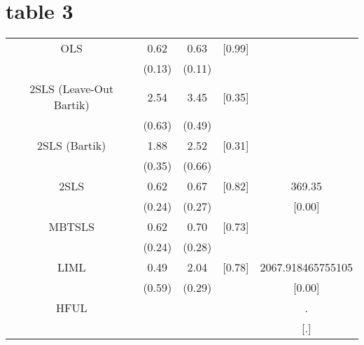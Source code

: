 \documentclass{article}
\begin{document}
\section{table 3}
\begin{tabular}{ccccc}
OLS & 0.62 & 0.63 & [0.99] & \\
    & (0.13)& (0.11)&         & \\
2SLS (Leave-Out Bartik) & 2.54 & 3.45 & [0.35] & \\
    & (0.63) & (0.49) &         & \\
2SLS (Bartik) & 1.88 & 2.52 & [0.31] & \\
    & (0.35) & (0.66) &         & \\
2SLS & 0.62 & 0.67 & [0.82] & 369.35 \\
    & (0.24)& (0.27)&         & [0.00] \\
MBTSLS & 0.62 & 0.70 & [0.73] & \\
    & (0.24)& (0.28)&         & \\
LIML & 0.49 & 2.04 & [0.78] & 2067.918465755105\\
    & (0.59)& (0.29)&         & [0.00] \\
HFUL &  &  &  & . \\
    & & &         &  [.] \\
\end{tabular}
\end{document}
